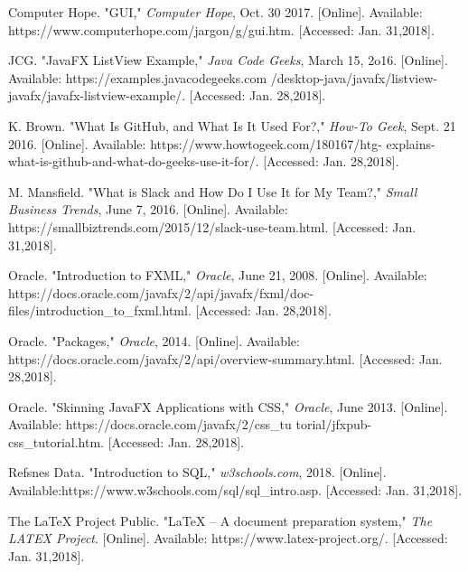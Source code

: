 \documentclass{article}
\begin{document}
\newpage
\begin{thebibliography}{9}

Computer Hope. "GUI," \textit{Computer Hope}, Oct. 30 2017. [Online]. Available: https://www.computerhope.com/jargon/g/gui.htm. [Accessed: Jan. 31,2018].

JCG. "JavaFX ListView Example," \textit{Java Code Geeks}, March 15, 2o16. [Online]. Available: https://examples.javacodegeeks.com /desktop-java/javafx/listview-javafx/javafx-listview-example/. [Accessed: Jan. 28,2018].

K. Brown. "What Is GitHub, and What Is It Used For?," \textit{How-To Geek}, Sept. 21 2016. [Online]. Available: https://www.howtogeek.com/180167/htg- explains-what-is-github-and-what-do-geeks-use-it-for/. [Accessed: Jan. 28,2018].

M. Mansfield. "What is Slack and How Do I Use It for My Team?," \textit{Small Business Trends}, June 7, 2016. [Online]. Available: https://smallbiztrends.com/2015/12/slack-use-team.html. [Accessed: Jan. 31,2018].

Oracle. "Introduction to FXML," \textit{Oracle}, June 21, 2008. [Online]. Available: https://docs.oracle.com/javafx/2/api/javafx/fxml/doc-files/introduction\_to\_fxml.html. [Accessed: Jan. 28,2018].

Oracle. "Packages," \textit{Oracle}, 2014. [Online]. Available: https://docs.oracle.com/javafx/2/api/overview-summary.html. [Accessed: Jan. 28,2018].

Oracle. "Skinning JavaFX Applications with CSS," \textit{Oracle}, June 2013. [Online]. Available: https://docs.oracle.com/javafx/2/css\_tu torial/jfxpub-css\_tutorial.htm. [Accessed: Jan. 28,2018].

Refsnes Data. "Introduction to SQL," \textit{w3schools.com}, 2018. [Online]. Available:https://www.w3schools.com/sql/sql\_intro.asp. [Accessed: Jan. 31,2018].

The LaTeX Project Public. "LaTeX – A document preparation system," \textit{The LATEX Project}. [Online]. Available: https://www.latex-project.org/. [Accessed: Jan. 31,2018].







\end{thebibliography}

 
\end{document}
